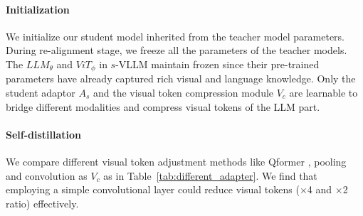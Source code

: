 \paragraph{Initialization} We initialize our student model inherited from the teacher model parameters. During re-alignment stage, we freeze all the parameters of the teacher models. The $LLM_\theta$ and $ViT_{\phi}$ in $s$-VLLM maintain frozen since their pre-trained parameters have already captured rich visual and language knowledge. Only the student adaptor $A_s$ and the visual token compression module $V_c$ are learnable to  bridge different modalities and compress visual tokens of the LLM part.

\paragraph{Self-distillation} We compare different visual token adjustment methods like Qformer \cite{li2023blip}, pooling and convolution as $V_c$ as in Table~\ref{tab:different_adapter}. We find that
employing a simple convolutional layer could reduce visual tokens ($\times$4 and $\times$2 ratio) effectively.


